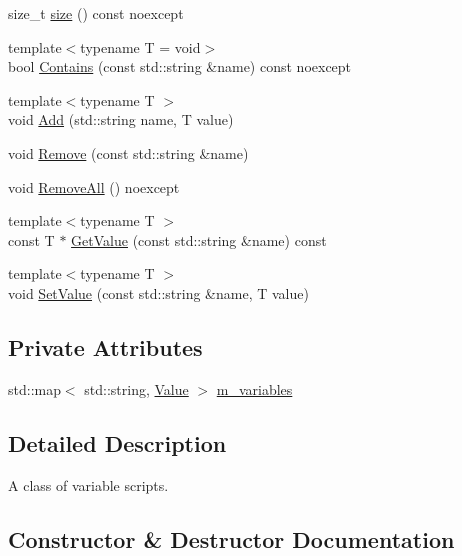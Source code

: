 \begin{DoxyCompactItemize}
\item 
size\+\_\+t \mbox{\hyperlink{classmage_1_1_variable_script_a20e376c802dae71e001037afc316c795}{size}} () const noexcept
\item 
{\footnotesize template$<$typename T  = void$>$ }\\bool \mbox{\hyperlink{classmage_1_1_variable_script_a9b3328dd026af0a5fe4d64730b37742f}{Contains}} (const std\+::string \&name) const noexcept
\item 
{\footnotesize template$<$typename T $>$ }\\void \mbox{\hyperlink{classmage_1_1_variable_script_aa9890d4635f28c3f9de29366f4ea1238}{Add}} (std\+::string name, T value)
\item 
void \mbox{\hyperlink{classmage_1_1_variable_script_a2cc1bcca6c1f8544c3f9925767290271}{Remove}} (const std\+::string \&name)
\item 
void \mbox{\hyperlink{classmage_1_1_variable_script_add51955d83e85e6d6acd82cfe40bed26}{Remove\+All}} () noexcept
\item 
{\footnotesize template$<$typename T $>$ }\\const T $\ast$ \mbox{\hyperlink{classmage_1_1_variable_script_ac5bce3006c899d5b04d9532c657f2aa4}{Get\+Value}} (const std\+::string \&name) const
\item 
{\footnotesize template$<$typename T $>$ }\\void \mbox{\hyperlink{classmage_1_1_variable_script_a87095ed6e4668629d3ffa7a390c6799b}{Set\+Value}} (const std\+::string \&name, T value)
\end{DoxyCompactItemize}
\subsection*{Private Attributes}
\begin{DoxyCompactItemize}
\item 
std\+::map$<$ std\+::string, \mbox{\hyperlink{namespacemage_a68ae02d3a746ed2f285aa2b10f131a21}{Value}} $>$ \mbox{\hyperlink{classmage_1_1_variable_script_ac10e99180b980c52f14e27dd8825bce9}{m\+\_\+variables}}
\end{DoxyCompactItemize}


\subsection{Detailed Description}
A class of variable scripts. 

\subsection{Constructor \& Destructor Documentation}
\mbox{\label{classmage_1_1_variable_script_a996678899f4ffdaa94ad9a4dcd441d1c}} 
